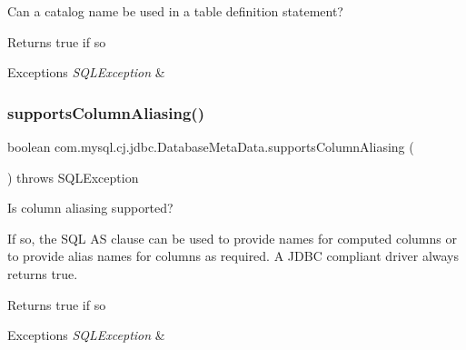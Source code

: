 Can a catalog name be used in a table definition statement?

\begin{DoxyReturn}{Returns}
true if so 
\end{DoxyReturn}

\begin{DoxyExceptions}{Exceptions}
{\em S\+Q\+L\+Exception} & \\
\hline
\end{DoxyExceptions}
\mbox{\label{classcom_1_1mysql_1_1cj_1_1jdbc_1_1_database_meta_data_ac53c31cb08e612553dec9e80a8008133}} 
\subsubsection{\texorpdfstring{supports\+Column\+Aliasing()}{supportsColumnAliasing()}}
{\footnotesize\ttfamily boolean com.\+mysql.\+cj.\+jdbc.\+Database\+Meta\+Data.\+supports\+Column\+Aliasing (\begin{DoxyParamCaption}{ }\end{DoxyParamCaption}) throws S\+Q\+L\+Exception}

Is column aliasing supported? 

If so, the S\+QL AS clause can be used to provide names for computed columns or to provide alias names for columns as required. A J\+D\+BC compliant driver always returns true. 

\begin{DoxyReturn}{Returns}
true if so 
\end{DoxyReturn}

\begin{DoxyExceptions}{Exceptions}
{\em S\+Q\+L\+Exception} & \\
\hline
\end{DoxyExceptions}
\mbox{\label{classcom_1_1mysql_1_1cj_1_1jdbc_1_1_database_meta_data_afabf2d6ef6b7cb8066fb868dee34deec}} 
